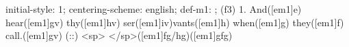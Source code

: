 initial-style: 1;
centering-scheme: english;
def-m1: \grealign;
(f3) 1. And([em1]e) hear([em1]gv) thy([em1]hv) ser([em1]iv)vants([em1]h) when([em1]g) they([em1]f) call.([em1]gv) (::) <sp> </sp>([em1]fg/hg)([em1]gfg)